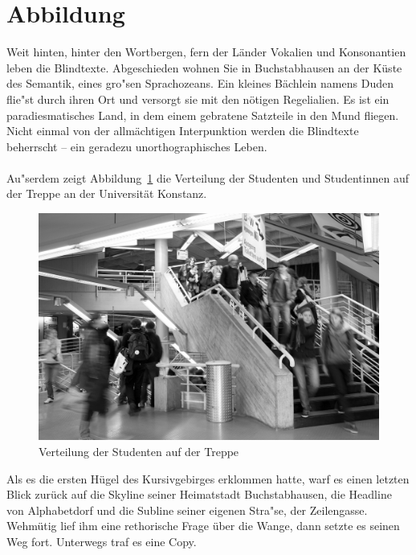 \documentclass[11pt, rgb]{scrreprt}
\begin{document}


\section{Abbildung}

Weit hinten, hinter den Wortbergen, fern der Länder Vokalien und Konsonantien leben die Blindtexte. Abgeschieden wohnen Sie in Buchstabhausen an der Küste des Semantik, eines gro"sen Sprachozeans. Ein kleines Bächlein namens Duden flie"st durch ihren Ort und versorgt sie mit den nötigen Regelialien. Es ist ein paradiesmatisches Land, in dem einem gebratene Satzteile in den Mund fliegen. Nicht einmal von der allmächtigen Interpunktion werden die Blindtexte beherrscht – ein geradezu unorthographisches Leben.\\
\\
Au"serdem zeigt Abbildung~\ref{fig:treppe} die Verteilung der Studenten und Studentinnen auf der Treppe an der Universität Konstanz.
\begin{figure}[H]
\includegraphics[width=\textwidth]{graphics/indoor_sw.png}
\caption{Verteilung der Studenten auf der Treppe}
\label{fig:treppe}
\end{figure}

\noindent Als es die ersten Hügel des Kursivgebirges erklommen hatte, warf es einen letzten Blick zurück auf die Skyline seiner Heimatstadt Buchstabhausen, die Headline von Alphabetdorf und die Subline seiner eigenen Stra"se, der Zeilengasse. Wehmütig lief ihm eine rethorische Frage über die Wange, dann setzte es seinen Weg fort. Unterwegs traf es eine Copy.
\end{document}
